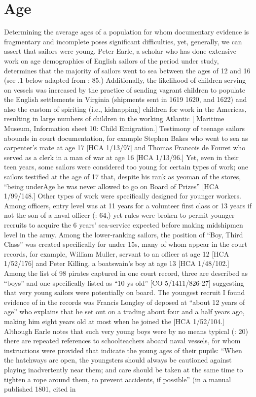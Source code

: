 \section{{Age}}\label{sec:3.4}

  Determining the average ages of a population for whom documentary evidence is fragmentary and incomplete poses significant difficulties, yet, generally, we can assert that sailors were young. Peter Earle, a scholar who has done extensive work on age demographics of English sailors of the period under study, determines that the majority of sailors went to sea between the ages of 12 and 16 (see .1 below adapted from \citealt{Earle1993}: 85.) Additionally, the likelihood of children serving on vessels was increased by the practice of sending vagrant children to populate the English settlements in Virginia (shipments sent in 1619 1620, and 1622) and also the custom of spiriting (i.e., kidnapping) children for work in the Americas, resulting in large numbers of children in the working Atlantic [ Maritime Museum, Information sheet 10: Child Emigration.] Testimony of teenage sailors abounds in court documentation, for example Stephen Bakes who went to sea as carpenter’s mate at age 17 [HCA 1/13/97] and Thomas Francois de Fouret who served as a clerk in a man of war at age 16 [HCA 1/13/96.] Yet, even in their teen years, some sailors were considered too young for certain types of work; one sailors testified at the age of 17 that, despite his rank as yeoman of the stores, “being underAge he was never allowed to go on Board of Prizes” [HCA 1/99/148.] Other types of work were specifically designed for younger workers. Among officers, entry level was at 11 years for a volunteer first class or 13 years if not the son of a naval officer (\citealt{AdkinsAdkins2008}: 64,) yet rules were broken to permit younger recruits to acquire the 6 years’ sea-service expected before making midshipmen level in the army. Among the lower-ranking sailors, the position of “Boy, Third Class” was created specifically for under 15s, many of whom appear in the court records, for example, William Muller, servant to an officer at age 12 [HCA 1/52/176] and Peter Killing, a boatswain's boy at age 13 [HCA 1/48/102.] Among the list of 98 pirates captured in one court record, three are described as “boys” and one specifically listed as “10 ys old” [CO 5/1411/826-27] suggesting that very young sailors were potentially on board. The youngest recruit I found evidence of in the records was Francis Longley of  deposed at “about 12 years of age” who explains that he set out on a trading  about four and a half years ago, making him eight years old at most when he joined the  [HCA 1/52/104.] Although Earle notes that such very young boys were by no means typical (: 20) there are repeated references to schoolteachers aboard naval vessels, for whom instructions were provided that indicate the young ages of their pupils: “When the hatchways are open, the youngsters should always be cautioned against playing inadvertently near them; and care should be taken at the same time to tighten a rope around them, to prevent accidents, if possible” (in a manual published 1801, cited in 